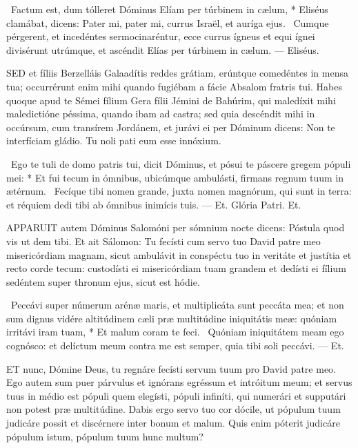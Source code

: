 \R\ Factum est, dum tólleret Dóminus Elíam per túrbinem in cælum, * Eliséus clamábat, dicens: Pater mi, pater mi, currus Israël, et auríga ejus. \V\ Cumque pérgerent, et incedéntes sermocinaréntur, ecce currus ígneus et equi ígnei divisérunt utrúmque, et ascéndit Elías per túrbinem in cælum. --- Eliséus.



\lettrine[lines=2]{S}{ED} et fíliis Berzelláis Galaadítis reddes grátiam, erúntque comedéntes in mensa tua; occurrérunt enim mihi quando fugiébam a fácie Absalom fratris tui. Habes quoque apud te Sémei fílium Gera fílii Jémini de Bahúrim, qui maledíxit mihi maledictióne péssima, quando ibam ad castra; sed quia descéndit mihi in occúrsum, cum transírem Jordánem, et jurávi ei per Dóminum dicens: Non te interfíciam gládio. Tu noli pati eum esse innóxium.

\R\ Ego te tuli de domo patris tui, dicit Dóminus, et pósui te páscere gregem pópuli mei: * Et fui tecum in ómnibus, ubicúmque ambulásti, firmans regnum tuum in ætérnum. \V\ Fecíque tibi nomen grande, juxta nomen magnórum, qui sunt in terra: et réquiem dedi tibi ab ómnibus inimícis tuis. --- Et. Glória Patri. Et.




\lettrine[lines=2]{A}{PPARUIT} autem Dóminus Salomóni per sómnium nocte dicens: Póstula quod vis ut dem tibi. Et ait Sálomon: Tu fecísti cum servo tuo David patre meo misericórdiam magnam, sicut ambulávit in conspéctu tuo in veritáte et justítia et recto corde tecum: custodísti ei misericórdiam tuam grandem et dedísti ei fílium sedéntem super thronum ejus, sicut est hódie.

\R\ Peccávi super númerum arénæ maris, et multiplicáta sunt peccáta mea; et non sum dignus vidére altitúdinem cæli præ multitúdine iniquitátis meæ: quóniam irritávi iram tuam, * Et malum coram te feci. \V\ Quóniam iniquitátem meam ego cognósco: et delíctum meum contra me est semper, quia tibi soli peccávi. --- Et.


\lettrine[lines=2]{E}{T} nunc, Dómine Deus, tu regnáre fecísti servum tuum pro David patre meo. Ego autem sum puer párvulus et ignórans egréssum et intróitum meum; et servus tuus in médio est pópuli quem elegísti, pópuli infiníti, qui numerári et supputári non potest præ multitúdine. Dabis ergo servo tuo cor dócile, ut pópulum tuum judicáre possit et discérnere inter bonum et malum. Quis enim póterit judicáre pópulum istum, pópulum tuum hunc multum?

